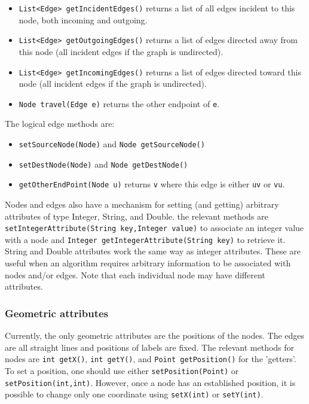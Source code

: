 \begin{itemize}
\item
\texttt{List<Edge>~getIncidentEdges()} returns a list of all edges incident to this node,
both incoming and outgoing.
\item
\texttt{List<Edge>~getOutgoingEdges()} returns a list of edges directed away
from this node (all incident edges if the graph is undirected).
\item
\texttt{List<Edge>~getIncomingEdges()} returns a list of edges directed toward
this node (all incident edges if the graph is undirected).
\item
\texttt{Node~travel(Edge~e)} returns the other endpoint of \texttt{e}.
\end{itemize}

The logical edge methods are:

\begin{itemize}
\item
\texttt{setSourceNode(Node)} and \texttt{Node~getSourceNode()}
\item
\texttt{setDestNode(Node)} and \texttt{Node~getDestNode()}
\item
\texttt{getOtherEndPoint(Node~u)} returns \texttt{v} where this edge is
either \texttt{uv} or \texttt{vu}.
\end{itemize}

Nodes and edges also have a mechanism for setting (and getting)
arbitrary attributes of type Integer, String, and Double.
the relevant methods are
\texttt{setIntegerAttribute(String~key,Integer~value)} 
to associate an integer value with a node and
\texttt{Integer~getIntegerAttribute(String~key)} to retrieve it.
String and Double attributes work the same way as integer attributes.
These are useful when an algorithm requires arbitrary information to be
associated with nodes and/or edges.
Note that each individual node may have different attributes.

\subsubsection*{Geometric attributes}

Currently, the only geometric attributes are the positions of the
nodes. The edges are all straight lines and positions of labels are fixed.
The relevant methods for nodes are
\texttt{int~getX()}, \texttt{int~getY()}, and \texttt{Point~getPosition()}
for the 'getters'. To set a position,
one should use either \texttt{setPosition(Point)} or \texttt{setPosition(int,int)}.
However, once a node has an established position, it is possible to change
only one coordinate using \texttt{setX(int)} or \texttt{setY(int)}.


